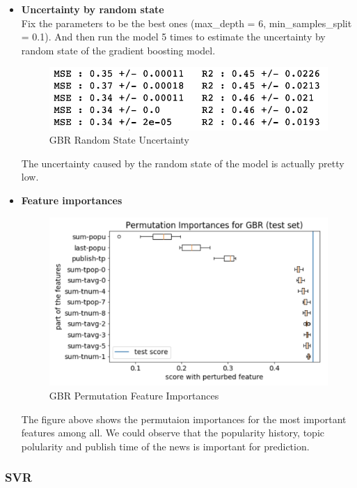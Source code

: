 \documentclass{article}
\begin{document}
\begin{itemize}
\item \textbf{Uncertainty by random state}\\
Fix the parameters to be the best ones (max\_depth = 6, min\_samples\_split = 0.1). And then run the model 5 times to estimate the uncertainty by random state of the gradient boosting model. 
\begin{figure}[H]
\centering
\includegraphics[scale=0.5]{"gbr_rs_unc"}
\caption{GBR Random State Uncertainty}
\end{figure}
The uncertainty caused by the random state of the model is actually pretty low.
\item \textbf{Feature importances}
\begin{figure}[H]
\centering
\includegraphics[scale=0.5]{"gbr_perm_imp"}
\caption{GBR Permutation Feature Importances}
\end{figure}
The figure above shows the permutaion importances for the most important features among all. We could observe that the popularity history, topic polularity and publish time of the news is important for prediction.
\end{itemize}



\subsubsection{SVR}
\end{document}
